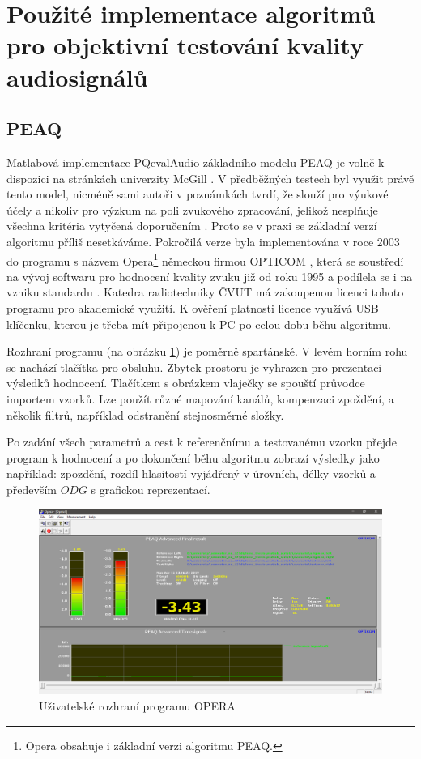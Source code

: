 \section{Použité implementace algoritmů pro objektivní testování kvality audiosignálů}

\subsection{PEAQ}

Matlabová implementace PQevalAudio základního modelu PEAQ je volně k dispozici na stránkách univerzity McGill \cite{web:mcgill}. V předběžných testech byl využit právě tento model, nicméně sami autoři v poznámkách tvrdí, že slouží pro výukové účely a nikoliv pro výzkum na poli zvukového zpracování, jelikož nesplňuje všechna kritéria vytyčená doporučením \cite{itur:1387}. Proto se v praxi se základní verzí algoritmu příliš nesetkáváme. Pokročilá verze byla implementována v roce 2003 do programu s názvem Opera\footnote{Opera obsahuje i základní verzi algoritmu PEAQ.} německou firmou OPTICOM \cite{web:opticom}, která se soustředí na vývoj softwaru pro hodnocení kvality zvuku již od roku 1995 a podílela se i na vzniku standardu \cite{itur:1387}. Katedra radiotechniky ČVUT má zakoupenou licenci tohoto programu pro akademické využití. K ověření platnosti licence využívá USB klíčenku, kterou je třeba mít připojenou k PC po celou dobu běhu algoritmu.

Rozhraní programu (na obrázku \ref{pic:Opera}) je poměrně spartánské. V levém horním rohu se nachází tlačítka pro obsluhu. Zbytek prostoru je vyhrazen pro prezentaci výsledků hodnocení. Tlačítkem  s obrázkem vlaječky se spouští průvodce importem vzorků. Lze použít různé mapování kanálů, kompenzaci zpoždění, a několik filtrů, například odstranění stejnosměrné složky.

Po zadání všech parametrů a cest k referenčnímu a testovanému vzorku přejde program k hodnocení a po dokončení běhu algoritmu zobrazí výsledky jako například: zpozdění, rozdíl hlasitostí vyjádřený v úrovních, délky vzorků a především $ODG$ s grafickou reprezentací.

\begin{figure}[h]
    \centering
    \includegraphics[width=.95\textwidth]{pic/opera.png}
    \caption{Uživatelské rozhraní programu OPERA}
    \label{pic:Opera}
\end{figure}



